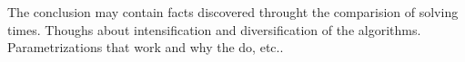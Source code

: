 The conclusion may contain facts discovered throught the comparision of solving times. Thoughs about intensification and diversification of the algorithms. Parametrizations that work and why the do, etc..


\pagebreak
